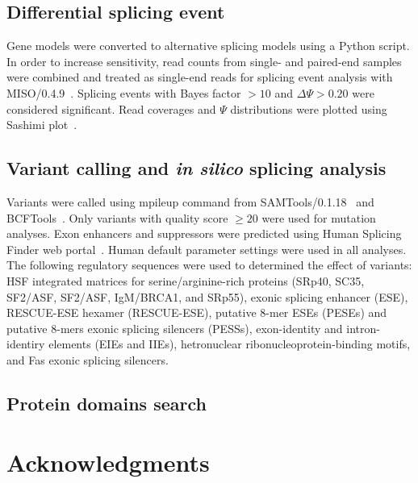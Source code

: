 \documentclass[10pt]{article}
\begin{document}
\subsection*{Differential splicing event}

Gene models were converted to alternative splicing models using a Python script.
In order to increase sensitivity, read counts from single- and paired-end
samples were combined and treated as single-end reads for splicing event
analysis with MISO/0.4.9~\cite{Katz:2010iv}.  Splicing events with Bayes factor
$>10$ and $\Delta\Psi>0.20$ were considered significant.  Read coverages and
$\Psi$ distributions were plotted using Sashimi plot~\cite{Katz:2013vx}.

\subsection*{Variant calling and {\em in silico} splicing analysis}

Variants were called using mpileup command from
SAMTools/0.1.18~\cite{li2009sequence} and BCFTools~\cite{bcftools}.  Only
variants with quality score $\ge20$ were used for mutation analyses.  Exon
enhancers and suppressors were predicted using Human Splicing Finder web
portal~\cite{desmet2009human}.  Human default parameter settings were used in
all analyses.  The following regulatory sequences were used to determined the
effect of variants: HSF integrated matrices for serine/arginine-rich proteins
(SRp40, SC35, SF2/ASF, SF2/ASF, IgM/BRCA1, and SRp55), exonic splicing enhancer
(ESE), RESCUE-ESE hexamer (RESCUE-ESE), putative 8-mer ESEs (PESEs) and putative
8-mers exonic splicing silencers (PESSs), exon-identity and intron-identiry
elements (EIEs and IIEs), hetronuclear ribonucleoprotein-binding motifs, and Fas
exonic splicing silencers.

\subsection*{Protein domains search}

\section*{Acknowledgments}

{}
\end{document}
